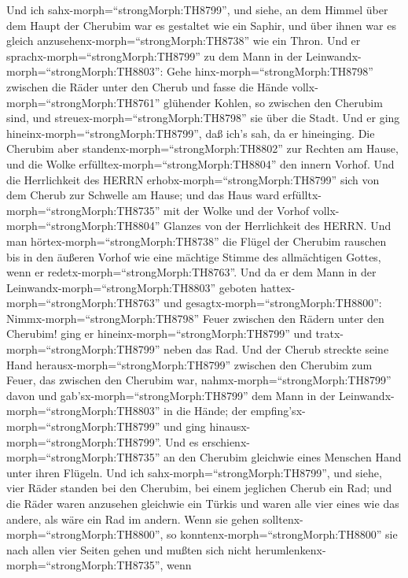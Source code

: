  Und ich sahx-morph=``strongMorph:TH8799'', und siehe, an
dem Himmel über dem Haupt der Cherubim war es gestaltet wie ein Saphir,
und über ihnen war es gleich anzusehenx-morph=``strongMorph:TH8738'' wie
ein Thron.  Und er sprachx-morph=``strongMorph:TH8799'' zu
dem Mann in der Leinwandx-morph=``strongMorph:TH8803'': Gehe
hinx-morph=``strongMorph:TH8798'' zwischen die Räder unter den Cherub
und fasse die Hände vollx-morph=``strongMorph:TH8761'' glühender Kohlen,
so zwischen den Cherubim sind, und streuex-morph=``strongMorph:TH8798''
sie über die Stadt. Und er ging hineinx-morph=``strongMorph:TH8799'',
daß ich's sah, da er hineinging.  Die Cherubim aber
standenx-morph=``strongMorph:TH8802'' zur Rechten am Hause, und die
Wolke erfülltex-morph=``strongMorph:TH8804'' den innern Vorhof.
 Und die Herrlichkeit des HERRN
erhobx-morph=``strongMorph:TH8799'' sich von dem Cherub zur Schwelle am
Hause; und das Haus ward erfülltx-morph=``strongMorph:TH8735'' mit der
Wolke und der Vorhof vollx-morph=``strongMorph:TH8804'' Glanzes von der
Herrlichkeit des HERRN.  Und man
hörtex-morph=``strongMorph:TH8738'' die Flügel der Cherubim rauschen bis
in den äußeren Vorhof wie eine mächtige Stimme des allmächtigen Gottes,
wenn er redetx-morph=``strongMorph:TH8763''.  Und da er dem
Mann in der Leinwandx-morph=``strongMorph:TH8803'' geboten
hattex-morph=``strongMorph:TH8763'' und
gesagtx-morph=``strongMorph:TH8800'': Nimmx-morph=``strongMorph:TH8798''
Feuer zwischen den Rädern unter den Cherubim! ging er
hineinx-morph=``strongMorph:TH8799'' und
tratx-morph=``strongMorph:TH8799'' neben das Rad.  Und der
Cherub streckte seine Hand herausx-morph=``strongMorph:TH8799'' zwischen
den Cherubim zum Feuer, das zwischen den Cherubim war,
nahmx-morph=``strongMorph:TH8799'' davon und
gab'sx-morph=``strongMorph:TH8799'' dem Mann in der
Leinwandx-morph=``strongMorph:TH8803'' in die Hände; der
empfing'sx-morph=``strongMorph:TH8799'' und ging
hinausx-morph=``strongMorph:TH8799''.  Und es
erschienx-morph=``strongMorph:TH8735'' an den Cherubim gleichwie eines
Menschen Hand unter ihren Flügeln.  Und ich
sahx-morph=``strongMorph:TH8799'', und siehe, vier Räder standen bei den
Cherubim, bei einem jeglichen Cherub ein Rad; und die Räder waren
anzusehen gleichwie ein Türkis  und waren alle vier eines
wie das andere, als wäre ein Rad im andern.  Wenn sie gehen
solltenx-morph=``strongMorph:TH8800'', so
konntenx-morph=``strongMorph:TH8800'' sie nach allen vier Seiten gehen
und mußten sich nicht herumlenkenx-morph=``strongMorph:TH8735'', wenn
